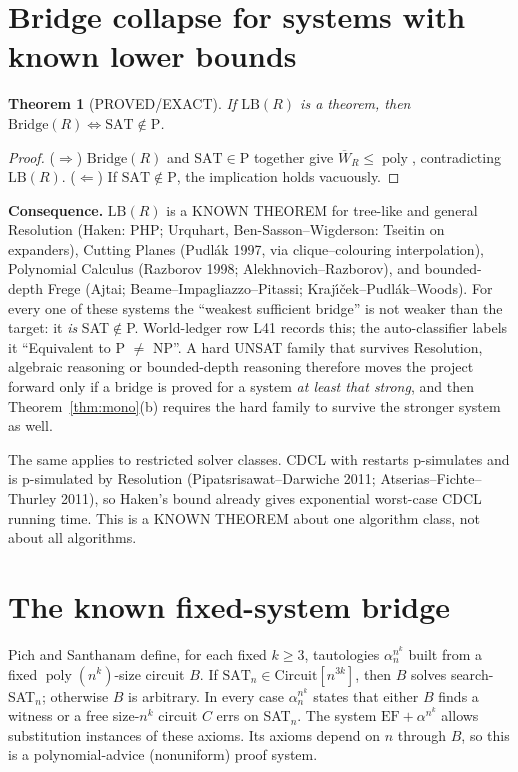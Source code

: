 \documentclass[11pt]{article}
\newtheorem{theorem}{Theorem}
\theoremstyle{definition}
\newcommand{\Wb}{\overline W}
\begin{document}
\section{Bridge collapse for systems with known lower bounds}
\begin{theorem}[PROVED/EXACT]\label{thm:collapse}
If $\mathrm{LB}(R)$ is a theorem, then $\mathrm{Bridge}(R)\iff\mathrm{SAT}\notin\mathrm P$.
\end{theorem}
\begin{proof}
($\Rightarrow$) $\mathrm{Bridge}(R)$ and $\mathrm{SAT}\in\mathrm P$ together give $\Wb_R\le\operatorname{poly}$, contradicting $\mathrm{LB}(R)$. ($\Leftarrow$) If $\mathrm{SAT}\notin\mathrm P$, the implication holds vacuously.
\end{proof}
\noindent\textbf{Consequence.} $\mathrm{LB}(R)$ is a KNOWN THEOREM for tree-like and general Resolution (Haken: PHP; Urquhart, Ben-Sasson--Wigderson: Tseitin on expanders), Cutting Planes (Pudl\'ak 1997, via clique--colouring interpolation), Polynomial Calculus (Razborov 1998; Alekhnovich--Razborov), and bounded-depth Frege (Ajtai; Beame--Impagliazzo--Pitassi; Kraj\'{\i}\v{c}ek--Pudl\'ak--Woods). For every one of these systems the ``weakest sufficient bridge'' is not weaker than the target: it \emph{is} SAT$\notin$P. World-ledger row L41 records this; the auto-classifier labels it ``Equivalent to P $\ne$ NP''. A hard UNSAT family that survives Resolution, algebraic reasoning or bounded-depth reasoning therefore moves the project forward only if a bridge is proved for a system \emph{at least that strong}, and then Theorem~\ref{thm:mono}(b) requires the hard family to survive the stronger system as well.

The same applies to restricted solver classes. CDCL with restarts p-simulates and is p-simulated by Resolution (Pipatsrisawat--Darwiche 2011; Atserias--Fichte--Thurley 2011), so Haken's bound already gives exponential worst-case CDCL running time. This is a KNOWN THEOREM about one algorithm class, not about all algorithms.

\section{The known fixed-system bridge}
Pich and Santhanam \cite{PS} define, for each fixed $k\ge3$, tautologies $\alpha^{n^k}_n$ built from a fixed $\operatorname{poly}(n^k)$-size circuit $B$. If $\mathrm{SAT}_n\in\mathrm{Circuit}[n^{3k}]$, then $B$ solves search-SAT$_n$; otherwise $B$ is arbitrary. In every case $\alpha^{n^k}_n$ states that either $B$ finds a witness or a free size-$n^k$ circuit $C$ errs on SAT$_n$. The system $\mathrm{EF}+\alpha^{n^k}$ allows substitution instances of these axioms. Its axioms depend on $n$ through $B$, so this is a polynomial-advice (nonuniform) proof system.
\end{document}
